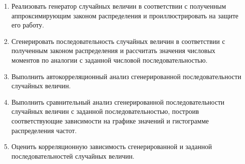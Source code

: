 \begin{enumerate}
    \item Реализовать генератор случайных величин в соответствии с полученным аппроксимирующим законом распределения и проиллюстрировать на защите его работу.

    \item Сгенерировать последовательность случайных величин в соответствии с полученным законом распределения и рассчитать значения числовых моментов по аналогии с заданной числовой последовательностью.

    \item Выполнить автокорреляционный анализ сгенерированной последовательности случайных величин.

    \item Выполнить сравнительный анализ сгенерированной последовательности случайных величин с заданной последовательностью, построив соответствующие зависимости на графике значений и гистограмме распределения частот.

    \item Оценить корреляционную зависимость сгенерированной и заданной последовательностей случайных величин.
\end{enumerate}